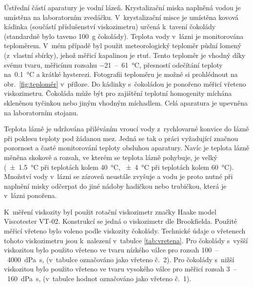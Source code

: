 \documentclass[12pt]{article}
\begin{document}
Ústřední částí aparatury je vodní lázeň. Krystalizační miska naplněná vodou je umístěna na laboratorním zvedáčku. V~krystalizační misce je umístěna kovová kádinka (součástí příslušenství viskozimetru) určená k~tavení čokolády (standardně bylo taveno \SI{100}{\gram} čokolády). Teplota vody v~lázni je monitorována teploměrem. \label{sec:teploměr}
V~mém případě byl použit meteorologický teploměr půdní lomený (z~vlastní sbírky), jehož měřicí kapalinou je rtuť. Tento teploměr je vhodný díky svému tvaru, měřicímu rozsahu \SI{-21}{}~--~\SI{61}{\degreeCelsius}, přesností odečítání teploty na~\SI{0,1}{\degreeCelsius} a krátké hysterezi. Fotografii teploměru je možné si prohlédnout na obr.~\ref{fig:teploměr} v~příloze. Do kádinky s~čokoládou je ponořeno měřicí vřeteno viskozimetru. Čokoláda může být pro zajištění teplotní homogenity míchána skleněnou tyčinkou nebo jiným vhodným míchadlem. Celá aparatura je upevněna na laboratorním stojanu.
\par\noindent
Teplota lázně je udržována přiléváním vroucí vody z~rychlovarné konvice do lázně při poklesu teploty pod žádanou mez. Jedná se tak o práci vyžadující značnou pozornost a časté monitorování teploty obsluhou aparatury. Navíc je teplota lázně měněna skokově a rozsah, ve kterém se teplota lázně pohybuje, je velký (\SI{\pm 1,5}{\degreeCelsius} při teplotách kolem \SI{40}{\degreeCelsius}, \SI{\pm 4}{\degreeCelsius} při teplotách kolem \SI{60}{\degreeCelsius}). Množství vody v~lázni se zároveň neustále zvyšuje a vodu je proto nutné při naplnění misky odčerpat do jiné nádoby hadičkou nebo trubičkou, která je v~lázni ponořena.
\par
\label{Vřetena}
\noindent
K~měření viskozity byl použit rotační viskozimetr značky Haake model Viscotester VT-02. Konstrukcí se jedná o viskozimetr dle Brookfielda. Použité měřicí vřeteno bylo voleno podle viskozity čokolády. Technické údaje o vřetenech tohoto viskozimetru jsou k~nalezení v~tabulce \ref{tab:vretena}. Pro čokolády s~vyšší viskozitou bylo použito vřeteno ve tvaru nízkého válce pro rozsah \SI{100}{}~--~\SI{4000}{\deci\pascal\second}, (v~tabulce označováno jako vřeteno č.~2). Pro čokolády s~nižší viskozitou bylo použito vřeteno ve tvaru vysokého válce pro měřicí rozsah \SI{3}{}~--~\SI{160}{\deci\pascal\second}, (v~tabulce hodnot označováno jako vřeteno č.~1).~\cite{man:VT-02}
\end{document}
